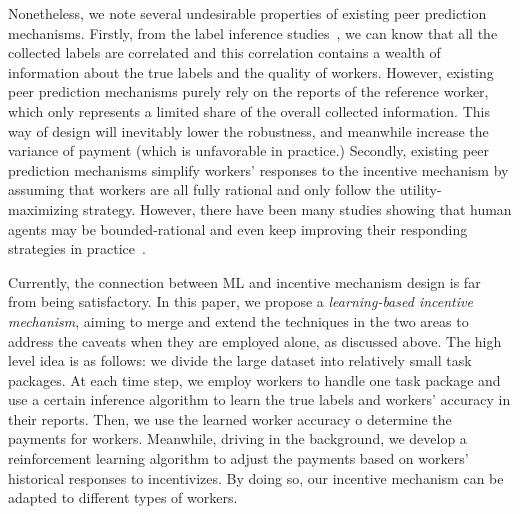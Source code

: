 Nonetheless, we note several undesirable properties of existing peer prediction mechanisms.
Firstly, from the label inference studies~\cite{zheng2017truth}, we can know that all the collected labels are correlated and this correlation contains a wealth of information about the true labels and the quality of workers.
However, existing peer prediction mechanisms purely rely on the reports of the reference worker, which only represents a limited share of the overall collected information.
This way of design will inevitably lower the robustness, and meanwhile increase the variance of payment (which is unfavorable in practice.)
Secondly, existing peer prediction mechanisms simplify workers' responses to the incentive mechanism by assuming that workers are all fully rational and only follow the utility-maximizing strategy.
However, there have been many studies showing that human agents may be bounded-rational and even keep improving their responding strategies in practice~\cite{simon1982models,mckelvey1995quantal,chastain2014algorithms}.




Currently, the connection between ML and incentive mechanism design is far from being satisfactory. In this paper, we propose a \emph{learning-based incentive mechanism}, aiming to merge and extend the techniques in the two areas to address the caveats when they are employed alone, as discussed above.
The high level idea is as follows: we divide the large dataset into relatively small task packages. At each time step, we employ workers to handle one task package and use a certain inference algorithm to learn the true labels and workers' accuracy in their reports. Then, we use the learned worker accuracy o determine the payments for workers. Meanwhile, driving in the background, we develop a reinforcement learning algorithm to adjust the payments based on workers' historical responses to incentivizes. By doing so, our incentive mechanism can be adapted to different types of workers.



